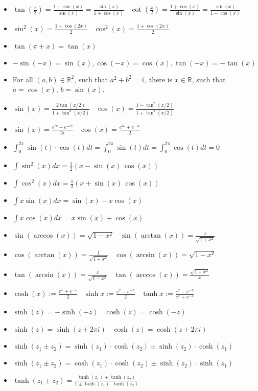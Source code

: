 \documentclass[]{article}
\newcommand{\R}{\mathbb R}
\begin{document}
\begin{multicols*}{3}
\begin{itemize}
    \item $\tan(\frac{x}{2}) = \frac{1-\cos(x)}{\sin(x)} = \frac{\sin(x)}{1+\cos(x)}$ \ $\cot(\frac{x}{2}) = \frac{1+\cos(x)}{\sin(x)} = \frac{\sin(x)}{1-\cos(x)}$
    \item $\sin^2(x) = \frac{1-\cos(2x)}{2}$
    \ $\cos^2(x) = \frac{1+\cos(2x)}{2}$
    \item $\tan(\pi + x) = \tan(x)$
    \item $-\sin(-x) = \sin(x), \cos(-x) = \cos(x), \tan(-x) = -\tan(x)$
    \item For all $(a,b)\in \R^2$, such that $a^2+b^2 = 1$, there is $x\in\R$, such that $a = \cos(x)$, $b = \sin(x)$.
    \item $\sin(x) = \frac{2\tan(x/2)}{1+\tan^2(x/2)}$
    \ $\cos(x) = \frac{1-\tan^2(x/2)}{1+\tan^2(x/2)}$
    \item $\sin(x) = \frac{e^{ix} - e^{-ix}}{2i}$
    \ $\cos(x) = \frac{e^{ix} + e^{-ix}}{2}$
    \item $\int_0^{2\pi} \sin(t)\cdot \cos(t) dt = \int_0^{2\pi} \sin(t) dt = \int_0^{2\pi} \cos(t) dt = 0$
    \item $\int \sin^2(x) dx = \frac{1}{2} (x-\sin(x) \, \cos(x))$
    \item $\int \cos^2(x) dx = \frac{1}{2} (x+\sin(x) \, \cos(x))$
    \item $\int x \sin(x) dx = \sin (x)-x \cos (x)$
    \item $\int x \cos(x) dx = x \sin (x)+\cos (x)$
    \item $\sin(\arccos(x)) = \sqrt{1-x^{2}}$ \ $\sin(\arctan(x)) = \frac{x}{\sqrt{1+x^{2}}}$ 
    \item $\cos(\arctan(x)) = \frac{1}{\sqrt{1+x^{2}}}$ \ $\cos(\arcsin(x)) = \sqrt{1-x^{2}}$ 
    \item $\tan(\arcsin(x)) = \frac{x}{\sqrt{1-x^{2}}}$ \ $\tan(\arccos(x)) = \frac{\sqrt{1-x^{2}}}{x}$
    \item $\cosh(x) := \frac{e^x + e^{-x}}{2}$ \ $\sinh x := \frac{e^x - e^{-x}}{2}$ \ $\tanh x := \frac{e^x - e^{-x}}{e^x + e^{-x}}$
    \item $\sinh(z) = -\sinh(-z)$ \ $\cosh(z) = \cosh(-z)$ 
    \item $\sinh(z) = \sinh(z + 2\pi i)$ \ $\cosh(z) = \cosh(z+ 2\pi i)$
    \item $\sinh(z_1 \pm z_2) = \sinh(z_1) \cdot \cosh(z_2) \pm \sinh(z_2) \cdot \cosh(z_1)$
    \item $\sinh(z_1 \pm z_2) = \cosh(z_1) \cdot \cosh(z_2) \pm \sinh(z_2) \cdot \sinh(z_1)$
    \item $\tanh(z_1 \pm z_2) = \frac{\tanh(z_1) \pm \tanh(z_2)}{1 \pm \tanh(z_1)\cdot \tanh(z_2)}$
    \end{itemize}


\end{multicols*}
\end{document}
